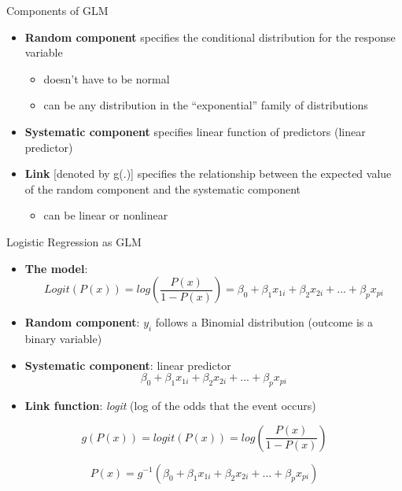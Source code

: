 \documentclass[
  ignorenonframetext,
]{beamer}
\providecommand{\tightlist}{%
  \setlength{\itemsep}{0pt}\setlength{\parskip}{0pt}}
\begin{document}
\begin{frame}{Components of GLM}
\protect\hypertarget{components-of-glm}{}

\begin{itemize}
\tightlist
\item
  \textbf{Random component} specifies the conditional distribution for
  the response variable

  \begin{itemize}
  \tightlist
  \item
    doesn't have to be normal
  \item
    can be any distribution in the ``exponential'' family of
    distributions
  \end{itemize}
\item
  \textbf{Systematic component} specifies linear function of predictors
  (linear predictor)
\item
  \textbf{Link} {[}denoted by g(.){]} specifies the relationship between
  the expected value of the random component and the systematic
  component

  \begin{itemize}
  \tightlist
  \item
    can be linear or nonlinear
  \end{itemize}
\end{itemize}

\end{frame}

\begin{frame}{Logistic Regression as GLM}
\protect\hypertarget{logistic-regression-as-glm}{}

\begin{itemize}
\item
  \textbf{The model}: \[
  Logit(P(x)) = log \left( \frac{P(x)}{1-P(x)} \right) = \beta_0 + \beta_1 x_{1i} + \beta_2 x_{2i} + ... + \beta_p x_{pi}
  \]
\item
  \textbf{Random component}: \(y_i\) follows a Binomial distribution
  (outcome is a binary variable)
\item
  \textbf{Systematic component}: linear predictor \[
  \beta_0 + \beta_1 x_{1i} + \beta_2 x_{2i} + ... + \beta_p x_{pi}
  \]
\item
  \textbf{Link function}: \emph{logit} (log of the odds that the event
  occurs)
\end{itemize}

\[
g(P(x)) = logit(P(x)) = log\left( \frac{P(x)}{1-P(x)} \right)
\]

\[
P(x) = g^{-1}\left( \beta_0 + \beta_1 x_{1i} + \beta_2 x_{2i} + ... + \beta_p x_{pi}
 \right)
\]

\end{frame}
\end{document}
